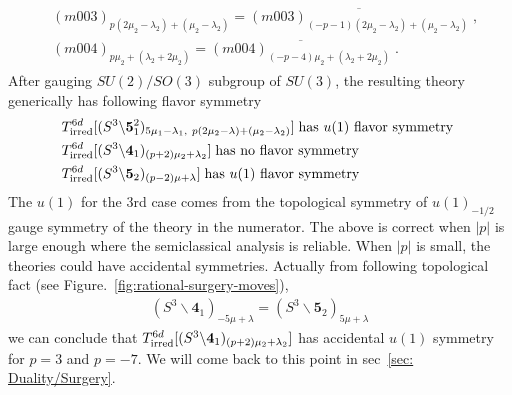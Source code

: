 \documentclass[a4paper,11pt]{article}
\begin{document}
%
\begin{align}
\begin{split}
 &(m003)_{p(2\mu_2-\lambda_2)+(\mu_2-\lambda_2)}  =\overline{(m003)_{(-p-1)(2\mu_2-\lambda_2)+(\mu_2-\lambda_2)}}\;,
 \\
 &
 (m004)_{ p \mu_2 + (\lambda_2+2 \mu_2)}  =\overline{ (m004)_{ (-p-4) \mu_2 + (\lambda_2+2 \mu_2)} }\;.
 \end{split}
\end{align}
%
After gauging $SU(2)/SO(3)$ subgroup of $SU(3)$, the resulting theory generically has following flavor symmetry 
%
\begin{align}
\begin{split}
&T^{6d}_{\rm irred}[(S^3\backslash \mathbf{5}^2_1)_{5\mu_1 -  \lambda_1,~ p(2\mu_2-\lambda)+(\mu_2-\lambda_2)}] \; \textrm{has $u(1)$ flavor symmetry }
\\
&T^{6d}_{\rm irred}[(S^3\backslash \mathbf{4}_1)_{(p+2)\mu_2 +\lambda_2}] \; \textrm{has no flavor symmetry }
\\
&T^{6d}_{\rm irred}[(S^3\backslash \mathbf{5}_2)_{(p-2)\mu + \lambda}]  \; \textrm{has $u(1)$ flavor symmetry }
\end{split}
\end{align}
%
The $u(1)$ for the 3rd case comes from the topological symmetry of $u(1)_{-1/2}$ gauge symmetry of the theory in the numerator. 
The above is correct when $|p|$ is large enough where the semiclassical analysis is reliable. When $|p|$ is small,  the theories could have accidental symmetries. Actually from following topological fact (see Figure.~\ref{fig:rational-surgery-moves}),
%
\begin{align}
(S^3\backslash \mathbf{4}_1)_{ -5 \mu +\lambda } = (S^3\backslash \mathbf{5}_2)_{5\mu +\lambda}
\end{align}
%
we can conclude that $T^{6d}_{\rm irred}[(S^3\backslash \mathbf{4}_1)_{(p+2)\mu_2 +\lambda_2}]$ has accidental $u(1)$ symmetry for $p=3$ and $p=-7$. We will come back to this point in sec~\ref{sec: Duality/Surgery}.


\end{document}
